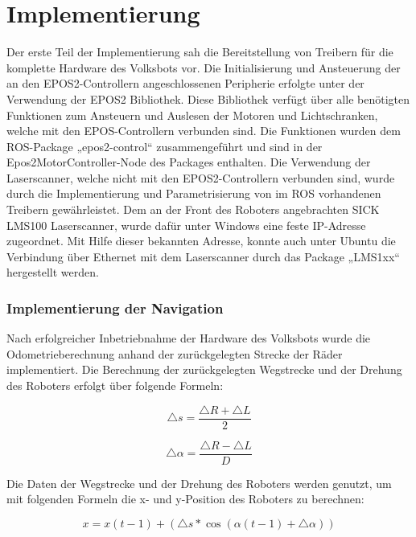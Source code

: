 \section{Implementierung}

Der erste Teil der Implementierung sah die Bereitstellung von Treibern für die komplette Hardware des Volksbots vor. Die Initialisierung und Ansteuerung der an den EPOS2-Controllern angeschlossenen Peripherie erfolgte unter der Verwendung der EPOS2 Bibliothek. Diese Bibliothek verfügt über alle benötigten Funktionen zum Ansteuern und Auslesen der Motoren und Lichtschranken, welche mit den EPOS-Controllern verbunden sind. Die Funktionen wurden dem ROS-Package „epos2-control“ zusammengeführt und sind in der Epos2MotorController-Node des Packages enthalten. 
Die Verwendung der Laserscanner, welche nicht mit den EPOS2-Controllern verbunden sind, wurde durch die Implementierung und Parametrisierung von im ROS vorhandenen Treibern gewährleistet. Dem an der Front des Roboters angebrachten SICK LMS100 Laserscanner, wurde dafür unter Windows eine feste IP-Adresse zugeordnet. Mit Hilfe dieser bekannten Adresse, konnte auch unter Ubuntu die Verbindung über Ethernet mit dem Laserscanner durch das Package „LMS1xx“  hergestellt werden.


\subsubsection{Implementierung der Navigation}
Nach erfolgreicher Inbetriebnahme der Hardware des Volksbots wurde die Odometrieberechnung anhand der zurückgelegten Strecke der Räder implementiert. Die Berechnung der zurückgelegten Wegstrecke und der Drehung des Roboters erfolgt über folgende Formeln\cite[S. 1]{Der:2000}:

\begin{equation}
\triangle s = \dfrac{\triangle R + \triangle L}{2}
\end{equation}
 
\begin{equation}
\triangle \alpha = \dfrac{\triangle R - \triangle L}{D}
\end{equation} 

Die Daten der Wegstrecke und der Drehung des Roboters werden genutzt, um mit folgenden Formeln die x- und y-Position des Roboters zu berechnen:

\begin{equation}
x = x(t-1) + (\triangle s * \cos (\alpha (t-1) + \triangle \alpha))
\end{equation} 

